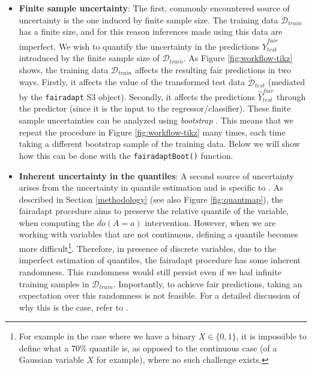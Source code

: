 \documentclass[
  nojss]{jss}
\begin{document}
\begin{itemize}
\item
  \textbf{Finite sample uncertainty}: The first, commonly encountered
  source of uncertainty is the one induced by finite sample size. The
  training data \(\mathcal{D}_{train}\) has a finite size, and for this
  reason inferences made using this data are imperfect. We wish to
  quantify the uncertainty in the predictions
  \(\widehat{Y}^{fair}_{test}\) introduced by the finite sample size of
  \(\mathcal{D}_{train}\). As Figure \ref{fig:workflow-tikz} shows, the
  training data \(\mathcal{D}_{train}\) affects the resulting fair
  predictions in two ways. Firstly, it affects the value of the
  transformed test data \(\widetilde{\mathcal{D}}_{test}\) (mediated by
  the \texttt{fairadapt} S3 object). Secondly, it affects the
  predictions \(\widehat{Y}^{fair}_{test}\) through the predictor (since
  it is the input to the regressor/classifier). These finite sample
  uncertainties can be analyzed using \emph{bootstrap}
  \citep{efron1994introduction}. This means that we repeat the procedure
  in Figure \ref{fig:workflow-tikz} many times, each time taking a
  different bootstrap sample of the training data. Below we will show
  how this can be done with the \texttt{fairadaptBoot()} function.
\item
  \textbf{Inherent uncertainty in the quantiles}: A second source of
  uncertainty arises from the uncertainty in quantile estimation and is
  specific to . As described in Section \ref{methodology}
  (see also Figure \ref{fig:quantmap}), the fairadapt procedure aims to
  preserve the relative quantile of the variable, when computing the
  \(do(A=a)\) intervention. However, when we are working with variables
  that are not continuous, defining a quantile becomes more
  difficult\footnote{For example in the case where we have a binary $X \in \lbrace 0, 1 \rbrace$, it is impossible to define what a 70\% quantile is, as opposed to the continuous case (of a Gaussian variable $X$ for example), where no such challenge exists.}.
  Therefore, in presence of discrete variables, due to the imperfect
  estimation of quantiles, the fairadapt procedure has some inherent
  randomness. This randomness would still persist even if we had
  infinite training samples in \(\mathcal{D}_{train}\). Importantly, to
  achieve fair predictions, taking an expectation over this randomness
  is not feasible. For a detailed discussion of why this is the case,
  refer to \citep[Section~5]{plecko2020fair}.
\end{itemize}
\end{document}
